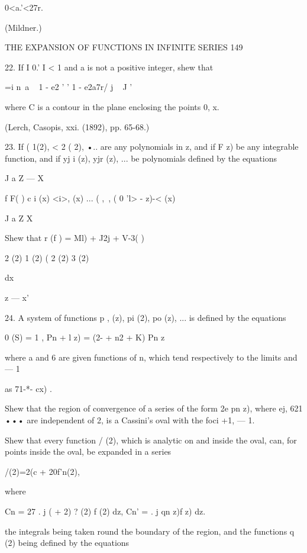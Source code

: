 {{{0<a.'<27r. 



(Mildner.) 



THE EXPANSION OF FUNCTIONS IN INFINITE SERIES 149 

22. If I 0.' I < 1 and a is not a positive integer, shew that 

 =i n~a ~ 1 - e2 ' ' 1 - e2a7r/ j  ~ J ' 

where C is a contour in the  plane enclosing the points 0, x. 

(Lerch, Casopis, xxi. (1892), pp. 65-68.) 

23. If ( 1(2), < 2 ( 2), •.. are any polynomials in z, and if F z) be any integrable 
function, and if yj i (z), yjr  (z), ... be polynomials defined by the equations 

J a Z — X 

f F( ) c i (x) <i>, (x) ... (  ,\ , ( 0 'l> - z)-<  (x)        

J a Z X 

Shew that r  (f )  = Ml) + J2j  + V-3( ) 



2 (2)  1 (2) ( 2 (2)  3 (2) 



dx 

z — x' 



24. A system of functions p , (z), pi (2), po (z), ... is defined by the equations 

 0 (S) = 1 , Pn + l z) = (2- +  n2 + K) Pn  z\ 

where a  and 6  are given functions of n, which tend respectively to the limits and — 1 

as 71-*- cx) . 

Shew that the region of convergence of a series of the form 2e pn z), where ej, 621 ••• 
are independent of 2, is a Cassini's oval with the foci +1, — 1. 

Shew that every function / (2), which is analytic on and inside the oval, can, for points 
inside the oval, be expanded in a series 

/(2)=2(c  + 20f'n(2), 



where 



Cn = 27 . j (   + 2) ?  (2) f (2) dz, Cn' =  . j qn  z)f z) dz. 



the integrals being taken round the boundary of the region, and the functions q  (2) being 
defined by the equations 

}}}
